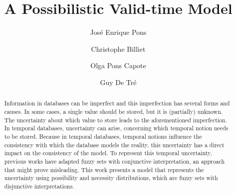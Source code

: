 \documentclass{llncs}
\begin{document}
\mainmatter              %
%
\title{A Possibilistic Valid-time Model}
%
%
\author{Jos\'e Enrique Pons \and Christophe Billiet \and Olga Pons Capote \and Guy De Tr\'e}
%
%
%

\maketitle              %
\def\JPicScale{0.5}
\begin{abstract}
Information in databases can be imperfect and this imperfection has several forms and causes. In some cases, a single value should be stored, but it is (partially) unknown. The uncertainty about which value to store leads to the aforementioned imperfection. In temporal databases, uncertainty can arise, concerning which temporal notion needs to be stored. Because in temporal databases, temporal notions influence the consistency with which the database models the reality, this uncertainty has a direct impact on the consistency of the model. To represent this temporal uncertainty, previous works have adapted fuzzy sets with conjunctive interpretation, an approach that might prove misleading. This work presents a model that represents the uncertainty using possibility and necessity distributions, which are fuzzy sets with disjunctive interpretations.
\end{abstract}
\end{document}
